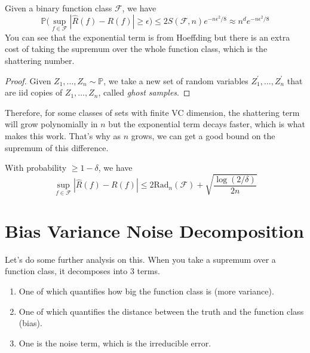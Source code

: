 \documentclass{article}
\begin{document}
  \begin{theorem}
    Given a binary function class $\mathcal{F}$, we have
    \begin{equation}
      \mathbb{P} \bigg( \sup_{f \in \mathcal{F}} | \hat{R} (f) - R(f) | \geq \epsilon \bigg) \leq 2 S(\mathcal{F}, n) e^{-n \epsilon^2 / 8} \approx n^d e^{-n \epsilon^2 / 8}
    \end{equation}
    You can see that the exponential term is from Hoeffding but there is an extra cost of taking the supremum over the whole function class, which is the shattering number.
  \end{theorem}
  \begin{proof}
    Given $Z_1, \ldots, Z_n \sim \mathbb{P}$, we take a new set of random variables $Z_1^\prime, \ldots, Z_n^\prime$ that are iid copies of $Z_1, \ldots, Z_n$, called \textit{ghost samples}. 
  \end{proof}

  Therefore, for some classes of sets with finite VC dimension, the shattering term will grow polynomially in $n$ but the exponential term decays faster, which is what makes this work. That's why as $n$ grows, we can get a good bound on the supremum of this difference. 

  \begin{theorem}
    With probability $\geq 1 - \delta$, we have 
    \begin{equation}
      \sup_{f \in \mathcal{F}} | \hat{R} (f) - R(f) | \leq 2 \mathrm{Rad}_n (\mathcal{F}) + \sqrt{\frac{\log (2 / \delta)}{2 n}}
    \end{equation}
  \end{theorem}

\section{Bias Variance Noise Decomposition} 

  Let's do some further analysis on this. When you take a supremum over a function class, it decomposes into 3 terms. 
  \begin{enumerate}
    \item One of which quantifies how big the function class is (more variance). 
    \item One of which quantifies the distance between the truth and the function class (bias).  
    \item One is the noise term, which is the irreducible error. 
  \end{enumerate}
\end{document}
